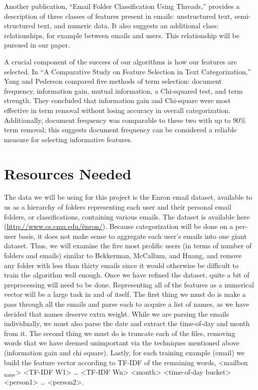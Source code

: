 \documentclass[11pt]{article}
\begin{document}
Another publication, “Email Folder Classification Using Threads,” provides a description of three classes of features present in emails: unstructured text, semi-structured text, and numeric data. It also suggests an additional class: relationships, for example between emails and users. This relationship will be pursued in our paper.

A crucial component of the success of our algorithms is how our features are selected.  In “A Comparative Study on Feature Selection in Text Categorization,” Yang and Pederson compared five methods of term selection: document frequency, information gain, mutual information, a Chi-squared test, and term strength.  They concluded that information gain and Chi-square were most effective in term removal without losing accuracy in overall categorization.  Additionally, document frequency was comparable to these two with up to 90\% term removal; this suggests document frequency can be considered a reliable measure for selecting informative features.
\section{Resources Needed}
\label{sec-3}


The data we will be using for this project is the Enron email dataset, available to us as a hierarchy of folders representing each user and their personal email folders, or classifications, containing various emails. The dataset is available here (\href{http://www.cs.cmu.edu/~enron/}{http://www.cs.cmu.edu/\~enron/}). Because categorization will be done on a per-user basis, it does not make sense to aggregate each user’s emails into one giant dataset. Thus, we will examine the five most prolific users (in terms of number of folders and emails) similar to Bekkerman, McCallum, and Huang, and remove any folder with less than thirty emails since it would otherwise be difficult to train the algorithm well enough.
Once we have refined the dataset, quite a bit of preprocessing will need to be done. Representing all of the features as a numerical vector will be a large task in and of itself. The first thing we must do is make a pass through all the emails and parse each to acquire a list of names, as we have decided that names deserve extra weight. While we are parsing the emails individually, we must also parse the date and extract the time-of-day and month from it. The second thing we must do is truncate each of the files, removing words that we have deemed unimportant via the techniques mentioned above (information gain and chi square). Lastly, for each training example (email) we build the feature vector according to TF-IDF of the remaining words, <mailbox$_{\mathrm{name}}$> <TF-IDF W1> … <TF-IDF Wn> <month> <time-of-day bucket> <person1> … <person2>.
\end{document}
